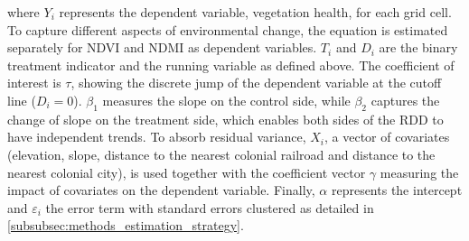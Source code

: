 where $Y_i$ represents the dependent variable, vegetation health, for each grid cell.
To capture different aspects of environmental change, the equation is estimated separately for NDVI and NDMI as dependent variables.
$T_i$ and $D_i$ are the binary treatment indicator and the running variable as defined above. 
The coefficient of interest is $\tau$, showing the discrete jump of the dependent variable at the cutoff line ($D_i = 0$).
$\beta_1$ measures the slope on the control side, while $\beta_2$ captures the change of slope on the treatment side, which enables both sides of the RDD to have independent trends.
To absorb residual variance, $X_i$, a vector of covariates (elevation, slope, distance to the nearest colonial railroad and distance to the nearest colonial city), is used together with the coefficient vector $\gamma$ measuring the impact of covariates on the dependent variable.
Finally, $\alpha$ represents the intercept and $\varepsilon_i$ the error term with standard errors clustered as detailed in \cref{subsubsec:methods_estimation_strategy}.